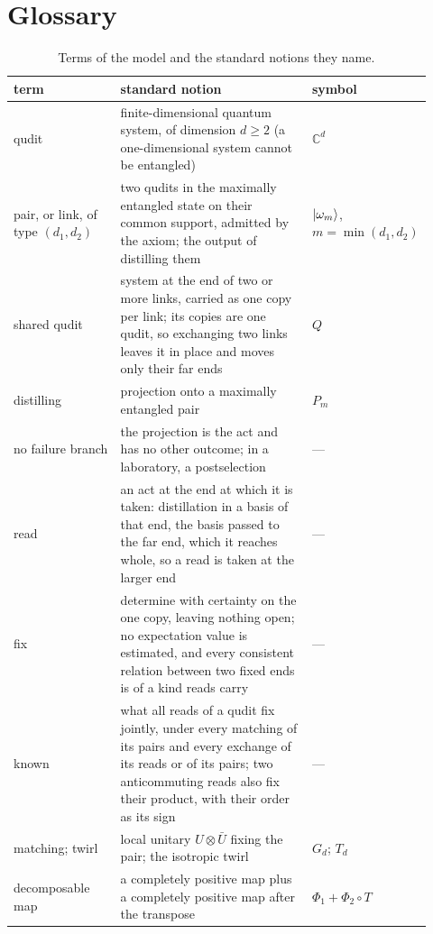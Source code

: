 \clearpage
\section{Glossary}
\label{sec:s-glossary}

\begin{table}[h]
\caption{Terms of the model and the standard notions they name.}
\label{tab:s-glossary}
\footnotesize
\begin{ruledtabular}
\begin{tabular}{p{0.26\linewidth}p{0.48\linewidth}p{0.18\linewidth}}
term & standard notion & symbol \\ \hline
qudit & finite-dimensional quantum system, of dimension $d\geq 2$ (a one-dimensional system cannot be entangled) & $\mathbb{C}^{d}$ \\
pair, or link, of type $(d_{1},d_{2})$ & two qudits in the maximally entangled state on their common support, admitted by the axiom; the output of distilling them & $|\omega_{m}\rangle$, $m=\min(d_{1},d_{2})$ \\
shared qudit & system at the end of two or more links, carried as one copy per link; its copies are one qudit, so exchanging two links leaves it in place and moves only their far ends & $Q$ \\
distilling & projection onto a maximally entangled pair & $P_{m}$ \\
no failure branch & the projection is the act and has no other outcome; in a laboratory, a postselection & --- \\
read & an act at the end at which it is taken: distillation in a basis of that end, the basis passed to the far end, which it reaches whole, so a read is taken at the larger end & --- \\
fix & determine with certainty on the one copy, leaving nothing open; no expectation value is estimated, and every consistent relation between two fixed ends is of a kind reads carry & --- \\
known & what all reads of a qudit fix jointly, under every matching of its pairs and every exchange of its reads or of its pairs; two anticommuting reads also fix their product, with their order as its sign & --- \\
matching; twirl & local unitary $U\otimes\bar{U}$ fixing the pair; the isotropic twirl & $G_{d}$; $T_{d}$ \\
decomposable map & a completely positive map plus a completely positive map after the transpose & $\Phi_{1}+\Phi_{2}\circ T$ \\

\end{tabular}
\end{ruledtabular}
\end{table}
